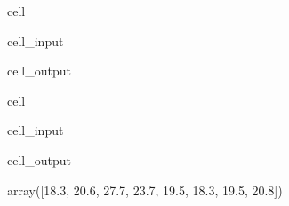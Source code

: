 \documentclass[letterpaper,10pt,english]{jupyterBook}
\begin{document}
\begin{sphinxuseclass}{cell}
\begin{sphinxVerbatimInput}
\begin{sphinxuseclass}{cell_input}
\begin{sphinxVerbatim}[commandchars=\\\{\}]

  
  \PYG{p}{[}\PYG{p}{]}  
\end{sphinxVerbatim}

\end{sphinxuseclass}\end{sphinxVerbatimInput}
\begin{sphinxVerbatimOutput}

\begin{sphinxuseclass}{cell_output}
\noindent{}

\end{sphinxuseclass}\end{sphinxVerbatimOutput}

\end{sphinxuseclass}
\begin{sphinxuseclass}{cell}\begin{sphinxVerbatimInput}

\begin{sphinxuseclass}{cell_input}
\begin{sphinxVerbatim}[commandchars=\\\{\}]
\end{sphinxVerbatim}

\end{sphinxuseclass}\end{sphinxVerbatimInput}
\begin{sphinxVerbatimOutput}

\begin{sphinxuseclass}{cell_output}
\begin{sphinxVerbatim}[commandchars=\\\{\}]
array([18.3, 20.6, 27.7, 23.7, 19.5, 18.3, 19.5, 20.8])
\end{sphinxVerbatim}

\end{sphinxuseclass}\end{sphinxVerbatimOutput}

\end{sphinxuseclass}
\end{document}
